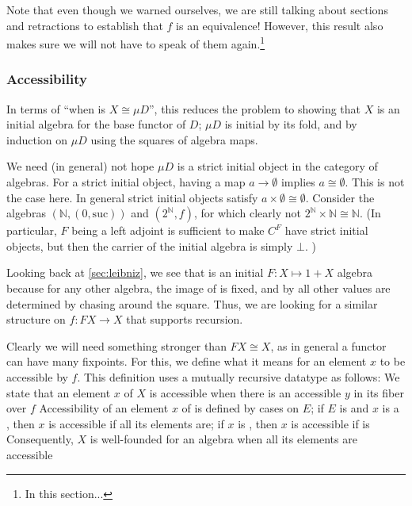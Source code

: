 Note that even though we warned ourselves, we are still talking about sections and retractions to establish that $f$ is an equivalence! However, this result also makes sure we will not have to speak of them again.\footnote{In this section...}

\subsubsection{Accessibility}
In terms of ``when is $X \cong \mu D$'', this reduces the problem to showing that $X$ is an initial algebra for the base functor of $D$; $\mu D$ is initial by its fold, and by induction on $\mu D$ using the squares of algebra maps. 

\begin{remark}
    We need (in general) not hope $\mu D$ is a strict initial object in the category of algebras. For a strict initial object, having a map $a \to \emptyset$ implies $a \cong \emptyset$. This is not the case here. In general strict initial objects satisfy $a \times \emptyset \cong \emptyset$. Consider the algebras $(\mathbb{N}, (0 , \mathrm{suc}))$ and $(2^\mathbb{N}, f)$, for which clearly not $2^\mathbb{N} \times \mathbb{N} \cong \mathbb{N}$.
    (In particular, $F$ being a left adjoint is sufficient to make $C^F$ have strict initial objects, but then the carrier of the initial algebra is simply $\bot$. )
\end{remark}

Looking back at \autoref{sec:leibniz}, we see that  is an initial $F: X \mapsto 1 + X$ algebra because for any other algebra, the image of  is fixed, and by  all other values are determined by chasing around the square. Thus, we are looking for a similar structure on $f : FX \to X$ that supports recursion.

Clearly we will need something stronger than $FX \cong X$, as in general a functor can have many fixpoints. For this, we define what it means for an element $x$ to be accessible by $f$. This definition uses a mutually recursive datatype as follows:
We state that an element $x$ of $X$ is accessible when there is an accessible $y$ in its fiber over $f$
Accessibility of an element $x$ of  is defined by cases on $E$; if $E$ is  and $x$ is a , then $x$ is accessible if all its elements are; if $x$ is , then $x$ is accessible if  is
Consequently, $X$ is well-founded for an algebra when all its elements are accessible

